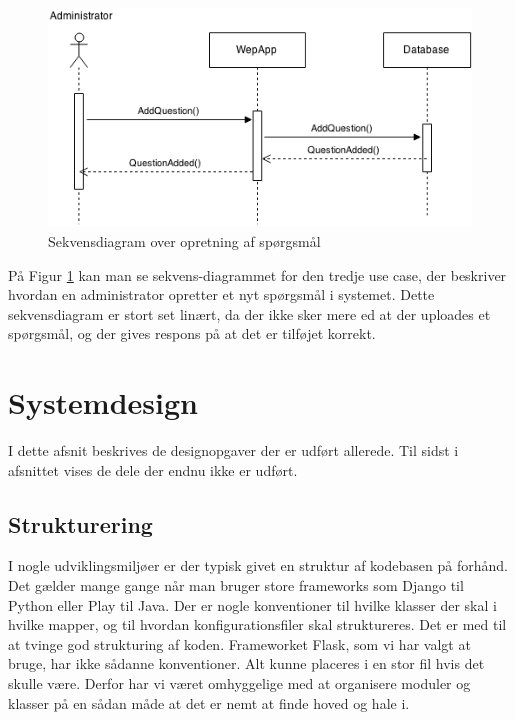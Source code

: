 \documentclass[11pt, a4paper]{article}
\begin{document}
\begin{figure}[h]
    \centering
    \includegraphics[width=0.8\linewidth]{figures/OpretSporgsmalUseCase.png}
    \caption{Sekvensdiagram over opretning af spørgsmål}
    \label{fig:opret_sp_sekvens}
\end{figure}
På Figur \ref{fig:opret_sp_sekvens} kan man se sekvens-diagrammet for den tredje use case, der beskriver hvordan en administrator opretter et nyt spørgsmål i systemet. Dette sekvensdiagram er stort set linært, da der ikke sker mere ed at der uploades et spørgsmål, og der gives respons på at det er tilføjet korrekt.

\section{Systemdesign}
\label{sec:systemdesign}
I dette afsnit beskrives de designopgaver der er udført allerede. Til sidst i afsnittet vises de dele der endnu ikke er udført.
\subsection{Strukturering}
\label{sub:strukturering}

I nogle udviklingsmiljøer er der typisk givet en struktur af kodebasen på forhånd. Det gælder mange gange når man bruger store frameworks som Django til Python eller Play til Java. Der er nogle konventioner til hvilke klasser der skal i hvilke mapper, og til hvordan konfigurationsfiler skal struktureres. Det er med til at tvinge god strukturing af koden. Frameworket Flask, som vi har valgt at bruge, har ikke sådanne konventioner. Alt kunne placeres i en stor fil hvis det skulle være. Derfor har vi været omhyggelige med at organisere moduler og klasser på en sådan måde at det er nemt at finde hoved og hale i.
\end{document}
